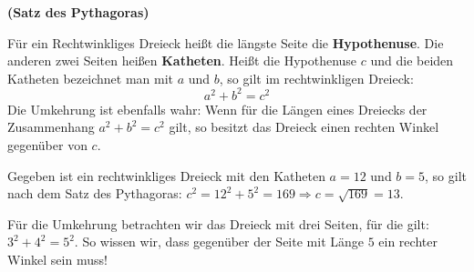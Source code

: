 \documentclass[ngerman, 12pt]{nssheetxea}
\begin{document}
\begin{theorem} \textbf{(Satz des Pythagoras)} \par
Für ein Rechtwinkliges Dreieck heißt die längste Seite die \textbf{Hypothenuse}. Die anderen zwei Seiten heißen \textbf{Katheten}. Heißt die Hypothenuse $c$ und die beiden Katheten bezeichnet man mit $a$ und $b$, so gilt im rechtwinkligen Dreieck:
\[ a^2 + b^2 = c^2\] 
Die Umkehrung ist ebenfalls wahr: Wenn für die Längen eines Dreiecks der Zusammenhang $a^2+b^2=c^2$ gilt, so besitzt das Dreieck einen rechten Winkel gegenüber von $c$.
\end{theorem}

\begin{example}
Gegeben ist ein rechtwinkliges Dreieck mit den Katheten $a=12$ und $b=5$, so gilt nach dem Satz des Pythagoras: $c^2=12^2+5^2=169 \Rightarrow c = \sqrt{169} = 13$. \par
Für die Umkehrung betrachten wir das Dreieck mit drei Seiten, für die gilt: $3^2+4^2=5^2$. So wissen wir, dass gegenüber der Seite mit Länge $5$ ein rechter Winkel sein muss!
\end{example}
\end{document}
